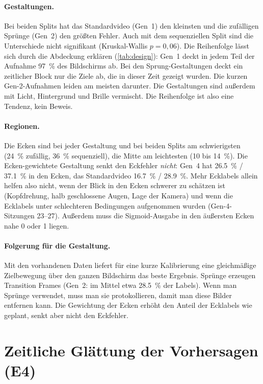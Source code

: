 \paragraph{Gestaltungen.} Bei beiden Splits hat das Standardvideo (Gen~1) den
kleinsten und die zufälligen Sprünge (Gen~2) den größten Fehler. Auch mit dem
sequenziellen Split sind die Unterschiede nicht signifikant (Kruskal-Wallis
$p=0,06$). Die Reihenfolge lässt sich durch die Abdeckung erklären
(\cref{tab:design}): Gen~1 deckt in jedem Teil der Aufnahme \SI{97}{\percent}
des Bildschirms ab. Bei den Sprung-Gestaltungen deckt ein zeitlicher Block nur
die Ziele ab, die in dieser Zeit gezeigt wurden. Die kurzen Gen-2-Aufnahmen
leiden am meisten darunter. Die Gestaltungen sind außerdem mit Licht,
Hintergrund und Brille vermischt. Die Reihenfolge ist also eine Tendenz, kein
Beweis.

\paragraph{Regionen.} Die Ecken sind bei jeder Gestaltung und bei beiden
Splits am schwierigsten (\SI{24}{\percent} zufällig, \SI{36}{\percent}
sequenziell), die Mitte am leichtesten (\SI{10}{} bis \SI{14}{\percent}). Die
Ecken-gewichtete Gestaltung senkt den Eckfehler \emph{nicht}: Gen~4 hat
\SI{26,5}{\percent} / \SI{37,1}{\percent} in den Ecken, das Standardvideo
\SI{16,7}{\percent} / \SI{28,9}{\percent}. Mehr Ecklabels allein helfen also
nicht, wenn der Blick in den Ecken schwerer zu schätzen ist (Kopfdrehung, halb
geschlossene Augen, Lage der Kamera) und wenn die Ecklabels unter schlechteren
Bedingungen aufgenommen wurden (Gen-4-Sitzungen 23--27). Außerdem muss die
Sigmoid-Ausgabe in den äußersten Ecken nahe 0 oder 1 liegen.

\paragraph{Folgerung für die Gestaltung.} Mit den vorhandenen Daten liefert
für eine kurze Kalibrierung eine gleichmäßige Zielbewegung über den ganzen
Bildschirm das beste Ergebnis. Sprünge erzeugen Transition Frames (Gen~2: im Mittel etwa
\SI{28,5}{\percent} der Labels). Wenn man Sprünge verwendet, muss man sie
protokollieren, damit man diese Bilder entfernen kann. Die Gewichtung der Ecken
erhöht den Anteil der Ecklabels wie geplant, senkt aber nicht den Eckfehler.

\section{Zeitliche Glättung der Vorhersagen (E4)}
\label{sec:smoothing}

